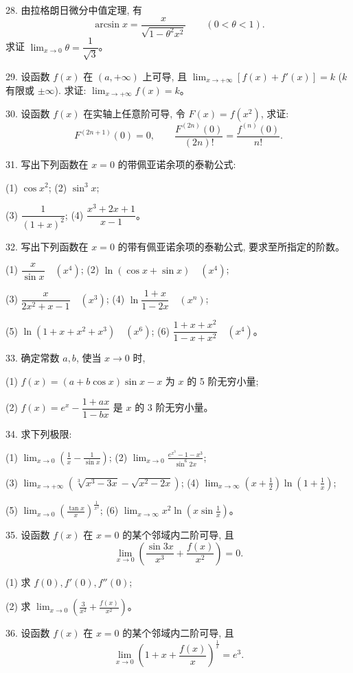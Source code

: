 \documentclass[UTF8, 12pt, fontset=fandol, oneside]{ctexart}
\begin{document}
28. 由拉格朗日微分中值定理, 有
\[
  \arcsin x=\frac{x}{\sqrt{1-\theta^2x^2}}\qquad (0<\theta<1).
\]
求证 $\lim_{x\to0}\theta=\dfrac1{\sqrt3}$。

29. 设函数 $f(x)$ 在 $(a,+\infty)$ 上可导, 且 $\lim_{x\to+\infty}[f(x)+f'(x)]=k$ ($k$ 有限或 $\pm\infty$). 求证: $\lim_{x\to+\infty}f(x)=k$。

30. 设函数 $f(x)$ 在实轴上任意阶可导, 令 $F(x)=f(x^2)$, 求证:
\[
  F^{(2n+1)}(0)=0,\qquad
  \frac{F^{(2n)}(0)}{(2n)!}=\frac{f^{(n)}(0)}{n!}.
\]

31. 写出下列函数在 $x=0$ 的带佩亚诺余项的泰勒公式:

(1) $\cos x^2$;\qquad
(2) $\sin^3x$;

(3) $\dfrac1{(1+x)^2}$;\qquad
(4) $\dfrac{x^3+2x+1}{x-1}$。

32. 写出下列函数在 $x=0$ 的带有佩亚诺余项的泰勒公式, 要求至所指定的阶数。

(1) $\dfrac{x}{\sin x}\quad (x^4)$;\qquad
(2) $\ln(\cos x+\sin x)\quad (x^4)$;

(3) $\dfrac{x}{2x^2+x-1}\quad (x^3)$;\qquad
(4) $\ln\dfrac{1+x}{1-2x}\quad (x^n)$;

(5) $\ln(1+x+x^2+x^3)\quad (x^6)$;\qquad
(6) $\dfrac{1+x+x^2}{1-x+x^2}\quad (x^4)$。

33. 确定常数 $a,b$, 使当 $x\to0$ 时,

(1) $f(x)=(a+b\cos x)\sin x-x$ 为 $x$ 的 5 阶无穷小量;

(2) $f(x)=e^x-\dfrac{1+ax}{1-bx}$ 是 $x$ 的 3 阶无穷小量。

34. 求下列极限:

(1) $\displaystyle\lim_{x\to0}\left(\frac1x-\frac1{\sin x}\right)$;\qquad
(2) $\displaystyle\lim_{x\to0}\frac{e^{x^3}-1-x^3}{\sin^6 2x}$;

(3) $\displaystyle\lim_{x\to+\infty}\left(\sqrt[3]{x^3-3x}-\sqrt{x^2-2x}\right)$;\qquad
(4) $\displaystyle\lim_{x\to\infty}\left(x+\frac12\right)\ln\left(1+\frac1x\right)$;

(5) $\displaystyle\lim_{x\to0}\left(\frac{\tan x}{x}\right)^{\frac1{x^2}}$;\qquad
(6) $\displaystyle\lim_{x\to\infty}x^2\ln\left(x\sin\frac1x\right)$。

35. 设函数 $f(x)$ 在 $x=0$ 的某个邻域内二阶可导, 且
\[
  \lim_{x\to0}\left(\frac{\sin3x}{x^3}+\frac{f(x)}{x^2}\right)=0.
\]

(1) 求 $f(0),f'(0),f''(0)$;

(2) 求 $\displaystyle\lim_{x\to0}\left(\frac3{x^2}+\frac{f(x)}{x^2}\right)$。

36. 设函数 $f(x)$ 在 $x=0$ 的某个邻域内二阶可导, 且
\[
  \lim_{x\to0}\left(1+x+\frac{f(x)}x\right)^{\frac1x}=e^3.
\]
\end{document}
